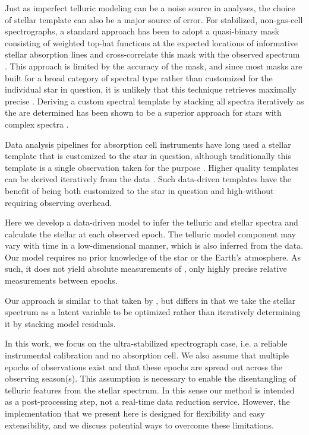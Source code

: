 \documentclass[modern]{aastex62}
\begin{document}
Just as imperfect telluric modeling can be a noise source in \EPRV analyses, the choice of stellar template can also be a major source of error.
For stabilized, non-gas-cell \RV spectrographs, a standard approach has been to adopt a quasi-binary mask consisting of weighted top-hat functions at the expected locations of informative stellar absorption lines and cross-correlate this mask with the observed spectrum \citep[e.g.][]{Baranne1979, Pepe2002}.
This approach is limited by the accuracy of the mask, and since most masks are built for a broad category of spectral type rather than customized for the individual star in question, it is unlikely that this technique retrieves maximally precise \RVs.
Deriving a custom spectral template by stacking all spectra iteratively as the \RVs are determined has been shown to be a superior approach for stars with complex spectra \citep{AngladaEscude2012}.

Data analysis pipelines for absorption cell instruments have long used a stellar template that is customized to the star in question, although traditionally this template is a single observation taken for the purpose \citep[e.g.][]{Butler1996}.
Higher quality templates can be derived iteratively from the data \citep{Sato2002, Gao2016}.
Such data-driven templates have the benefit of being both customized to the star in question and high-\SNR without requiring observing overhead.


Here we develop a data-driven model to infer the telluric and stellar spectra and calculate the stellar \RV at each observed epoch.
The telluric model component may vary with time in a low-dimensional manner, which is also inferred from the data.
Our model requires no prior knowledge of the star or the Earth's atmosphere.
As such, it does not yield absolute measurements of \RVs, only highly precise relative measurements between epochs.

Our approach is similar to that taken by \citet{Gao2016}, but differs in that we take the stellar spectrum as a latent variable to be optimized rather than iteratively determining it by stacking model residuals.

In this work, we focus on the ultra-stabilized spectrograph case, i.e. a reliable instrumental calibration and no absorption cell.
We also assume that multiple epochs of observations exist and that these epochs are spread out across the observing season(s).
This assumption is necessary to enable the disentangling of telluric features from the stellar spectrum.
In this sense our method is intended as a post-processing step, not a real-time data reduction service.
However, the implementation that we present here is designed for flexibility and easy extensibility, and we discuss potential ways to overcome these limitations.
\end{document}
